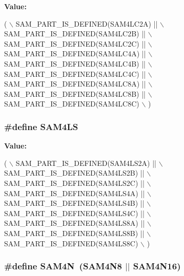 {\bfseries Value\-:}
\begin{DoxyCode}
( \(\backslash\)
                SAM\_PART\_IS\_DEFINED(SAM4LC2A) || \(\backslash\)
                SAM\_PART\_IS\_DEFINED(SAM4LC2B) || \(\backslash\)
                SAM\_PART\_IS\_DEFINED(SAM4LC2C) || \(\backslash\)
                SAM\_PART\_IS\_DEFINED(SAM4LC4A) || \(\backslash\)
                SAM\_PART\_IS\_DEFINED(SAM4LC4B) || \(\backslash\)
                SAM\_PART\_IS\_DEFINED(SAM4LC4C) || \(\backslash\)
                SAM\_PART\_IS\_DEFINED(SAM4LC8A) || \(\backslash\)
                SAM\_PART\_IS\_DEFINED(SAM4LC8B) || \(\backslash\)
                SAM\_PART\_IS\_DEFINED(SAM4LC8C)    \(\backslash\)
                )
\end{DoxyCode}
\hypertarget{group__sam__part__macros__group_gafd288e34365d8a47cadf64f9040b97c6}{
\subsubsection[{S\-A\-M4\-L\-S}]{\setlength{\rightskip}{0pt plus 5cm}\#define S\-A\-M4\-L\-S}}\label{group__sam__part__macros__group_gafd288e34365d8a47cadf64f9040b97c6}
{\bfseries Value\-:}
\begin{DoxyCode}
( \(\backslash\)
                SAM\_PART\_IS\_DEFINED(SAM4LS2A) || \(\backslash\)
                SAM\_PART\_IS\_DEFINED(SAM4LS2B) || \(\backslash\)
                SAM\_PART\_IS\_DEFINED(SAM4LS2C) || \(\backslash\)
                SAM\_PART\_IS\_DEFINED(SAM4LS4A) || \(\backslash\)
                SAM\_PART\_IS\_DEFINED(SAM4LS4B) || \(\backslash\)
                SAM\_PART\_IS\_DEFINED(SAM4LS4C) || \(\backslash\)
                SAM\_PART\_IS\_DEFINED(SAM4LS8A) || \(\backslash\)
                SAM\_PART\_IS\_DEFINED(SAM4LS8B) || \(\backslash\)
                SAM\_PART\_IS\_DEFINED(SAM4LS8C)    \(\backslash\)
                )
\end{DoxyCode}
\hypertarget{group__sam__part__macros__group_gadb4c0138a71e1c2dfb0c91ad3ea5861c}{
\subsubsection[{S\-A\-M4\-N}]{\setlength{\rightskip}{0pt plus 5cm}\#define S\-A\-M4\-N~(S\-A\-M4\-N8 $|$$|$ S\-A\-M4\-N16)}}\label{group__sam__part__macros__group_gadb4c0138a71e1c2dfb0c91ad3ea5861c}
